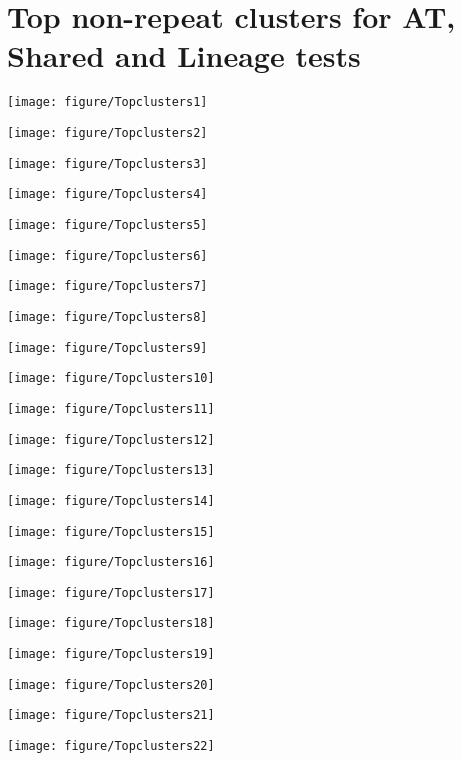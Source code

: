 \documentclass{article}\usepackage[]{graphicx}\usepackage[]{color}
\makeatletter
\def\maxwidth{ %
  \ifdim\Gin@nat@width>\linewidth
    \linewidth
  \else
    \Gin@nat@width
  \fi
}
\newenvironment{knitrout}{}{} %
\makeatother
\begin{document}
\section*{Top non-repeat clusters for AT, Shared and Lineage tests}
\begin{knitrout}
\color{fgcolor}
\texttt{[image: figure/Topclusters1]} 

\texttt{[image: figure/Topclusters2]} 

\texttt{[image: figure/Topclusters3]} 

\texttt{[image: figure/Topclusters4]} 

\texttt{[image: figure/Topclusters5]} 

\texttt{[image: figure/Topclusters6]} 

\texttt{[image: figure/Topclusters7]} 

\texttt{[image: figure/Topclusters8]} 

\texttt{[image: figure/Topclusters9]} 

\texttt{[image: figure/Topclusters10]} 

\texttt{[image: figure/Topclusters11]} 

\texttt{[image: figure/Topclusters12]} 

\texttt{[image: figure/Topclusters13]} 

\texttt{[image: figure/Topclusters14]} 

\texttt{[image: figure/Topclusters15]} 

\texttt{[image: figure/Topclusters16]} 

\texttt{[image: figure/Topclusters17]} 

\texttt{[image: figure/Topclusters18]} 

\texttt{[image: figure/Topclusters19]} 

\texttt{[image: figure/Topclusters20]} 

\texttt{[image: figure/Topclusters21]} 

\texttt{[image: figure/Topclusters22]} 

\end{knitrout}
\end{document}
